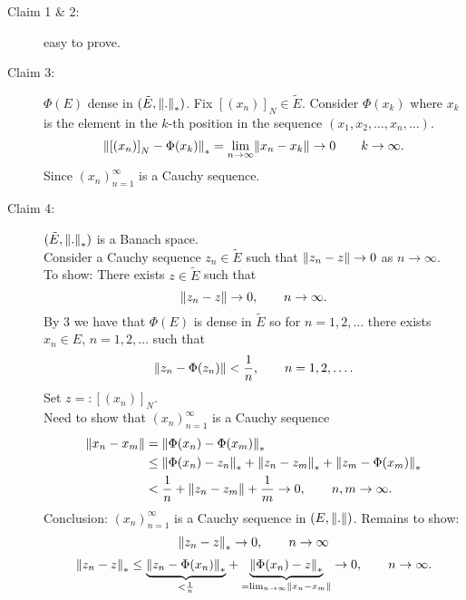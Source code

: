 \begin{description}
\item[Claim 1 \& 2:] easy to prove. 
\item[Claim 3:] $\Phi(E)$ dense in $(\tilde E,\norm{.}_*)$. Fix $\left[ (x_n) \right]_N \in \tilde E$. Consider $\Phi(x_k)$ where $x_k$ is the element in the $k$-th position in the sequence $(x_1,x_2, \dots,x_n, \dots)$.
\begin{align*}
	\norm{\left[ (x_n) \right]_N - \Phi(x_k)}_* = \lim_{n \to \infty}\norm{x_n - x_k} \to 0 \qquad k \to \infty.
\end{align*}
Since $(x_n)_{n=1}^{\infty}$ is a Cauchy sequence. \\
\item[Claim 4:] $(\tilde E, \norm{.}_*)$ is a Banach space.\\
Consider a Cauchy sequence $z_n \in \tilde E$ such that $\norm{z_n - z} \to 0$ as $n \to \infty$. \\
To show: There exists $z \in \tilde E$ such that 
\[
	\norm{z_n - z} \to 0, \qquad n \to \infty.
\]
By 3 we have that $\Phi(E)$ is dense in $ \tilde E$ so for $n=1,2,\dots$ there exists $x_n \in E$, $n=1,2,\dots$ such that
\[
	\norm{z_n - \Phi(z_n)} < \frac{1}{n}, \qquad  n=1,2,\dots.
\]
Set $z=: \left[ (x_n) \right]_N$. \\
Need to show that $(x_n)_{n=1}^{\infty}$ is a Cauchy sequence
\begin{align*}
	\norm{x_n - x_m} &= \norm{\Phi(x_n)-\Phi(x_m)}_* \\
	& \leq  \norm{\Phi(x_n)- z_n}_* + \norm{z_n-z_m}_* + \norm{z_m - \Phi(x_m)}_* \\
	&< \frac{1}{n} + \norm{z_n-z_m} + \frac{1}{m} \to 0, \qquad n,m \to \infty.
\end{align*}
Conclusion: $(x_n)_{n=1}^{\infty}$ is a Cauchy sequence in $(E, \norm{.})$. Remains to show:
\[
	\norm{z_n-z}_* \to 0, \qquad n \to \infty
\]
\[
	\norm{z_n - z}_* \leq \underset{< \frac{1}{n}}{\underbrace{\norm{z_n - \Phi(x_n)}_*}} + \underset{= \lim_{n \to \infty}\norm{x_n-x_m}}{\underbrace{\norm{\Phi(x_n)-z}_*}} \to 0, \qquad n \to \infty.
\]
\end{description}

